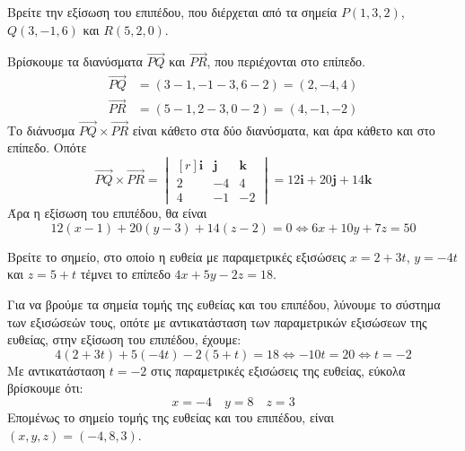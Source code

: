 \enlargethispage{\baselineskip}

\begin{example}
  Βρείτε την εξίσωση του επιπέδου, που διέρχεται από τα σημεία 
  $ P(1,3,2) $, $ Q(3,-1,6) $ και $R(5,2,0) $.
\end{example}
\begin{solution}
  Βρίσκουμε τα διανύσματα $ \vec{PQ} $ και $ \vec{PR} $, που περιέχονται στο επίπεδο.
  \begin{align*}
    \vec{PQ} &= (3-1,-1-3,6-2) = (2,-4,4) \\
    \vec{PR} &= (5-1,2-3,0-2) = (4,-1,-2)
  \end{align*} 
  Το διάνυσμα $ \vec{PQ} \times \vec{PR} $ είναι κάθετο στα δύο διανύσματα, και άρα 
  κάθετο και στο επίπεδο. Οπότε
  \[
    \vec{PQ} \times \vec{PR} = 
    \begin{vmatrix*}[r]
      \mathbf{i} & \mathbf{j} & \mathbf{k} \\
      2 & -4 & 4 \\
      4 & -1 & -2
    \end{vmatrix*} = 12 \mathbf{i} + 20 \mathbf{j} + 14 \mathbf{k}
  \] 
  Άρα η εξίσωση του επιπέδου, θα είναι 
  \[
    12(x-1) + 20(y-3) + 14(z-2) = 0 \Leftrightarrow 6x+10y+7z=50
  \]
\end{solution}

\pagebreak

\begin{example}
  Βρείτε το σημείο, στο οποίο η ευθεία με παραμετρικές εξισώσεις $ x=2+3t $, $ y=-4t
  $ και $ z=5+t $ τέμνει το επίπεδο $ 4x+5y-2z=18 $.
\end{example}
\begin{solution}
  Για να βρούμε τα σημεία τομής της ευθείας και του επιπέδου, λύνουμε το σύστημα των 
  εξισώσεών τους, οπότε με αντικατάσταση των παραμετρικών εξισώσεων της ευθείας, 
  στην εξίσωση του επιπέδου, έχουμε:
  \[
    4(2+3t) + 5(-4t) -2(5+t) = 18 \Leftrightarrow -10t=20 \Leftrightarrow t=-2 
  \] 
  Με αντικατάσταση $ t=-2 $ στις παραμετρικές εξισώσεις της ευθείας, εύκολα 
  βρίσκουμε ότι:
  \[
    x=-4 \quad y=8 \quad z=3
  \] 
  Επομένως το σημείο τομής της ευθείας και του επιπέδου, είναι $ (x,y,z) = (-4,8,3) $.
\end{solution}

